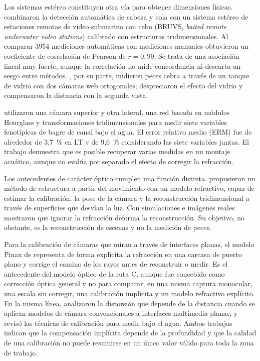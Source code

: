 Los sistemas estéreo constituyen otra vía para obtener dimensiones físicas. \textcite{Marrable2023} combinaron la detección automática de cabeza y cola con un sistema estéreo de estaciones remotas de video submarino con cebo (BRUVS, \emph{baited remote underwater video stations}) calibrado con estructuras tridimensionales. Al comparar 3954 mediciones automáticas con mediciones manuales obtuvieron un coeficiente de correlación de Pearson de $r = 0{,}99$. Se trata de una asociación lineal muy fuerte, aunque la correlación no mide concordancia ni descarta un sesgo entre métodos. \textcite{AlJubouri2017}, por su parte, midieron peces cebra a través de un tanque de vidrio con dos cámaras web ortogonales; despreciaron el efecto del vidrio y compensaron la distancia con la segunda vista.

\textcite{ZhangX2025} utilizaron una cámara superior y otra lateral, una red basada en módulos Hourglass y transformaciones tridimensionales para medir siete variables fenotípicas de bagre de canal bajo el agua. El error relativo medio (ERM) fue de alrededor de 3,7~\% en LT y de 9,6~\% considerando las siete variables juntas. El trabajo demuestra que es posible recuperar varias medidas en un montaje acuático, aunque no evalúa por separado el efecto de corregir la refracción.

Los antecedentes de carácter óptico cumplen una función distinta. \textcite{Qiao2019} propusieron un método de estructura a partir del movimiento con un modelo refractivo, capaz de estimar la calibración, la pose de la cámara y la reconstrucción tridimensional a través de superficies que desvían la luz. Con simulaciones e imágenes reales mostraron que ignorar la refracción deforma la reconstrucción. Su objetivo, no obstante, es la reconstrucción de escenas y no la medición de peces.

Para la calibración de cámaras que miran a través de interfaces planas, el modelo Pinax de \textcite{Luczynski2017} representa de forma explícita la refracción en una carcasa de puerto plano y corrige el camino de los rayos antes de reconstruir o medir. Es el antecedente del modelo óptico de la ruta C, aunque fue concebido como corrección óptica general y no para comparar, en una misma captura monocular, una escala sin corregir, una calibración implícita y un modelo refractivo explícito. En la misma línea, \textcite{Rofallski2022} analizaron la distorsión que depende de la distancia cuando se aplican modelos de cámara convencionales a interfaces multimedia planas, y \textcite{Shortis2015} revisó las técnicas de calibración para medir bajo el agua. Ambos trabajos indican que la compensación implícita depende de la profundidad y que la calidad de una calibración no puede resumirse en un único valor válido para toda la zona de trabajo.

